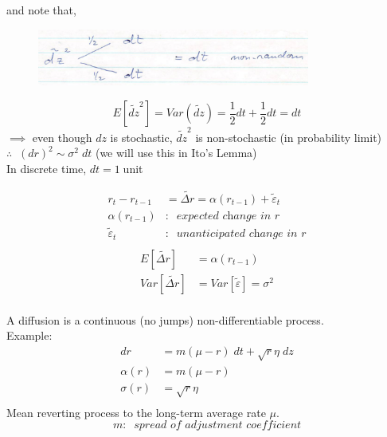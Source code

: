 \documentclass[
14pt,notheorems,hyperref={pdfauthor=whatever}
]{beamer}
\begin{document}
\begin{frame}
and note that,\\
\begin{figure}[dz2]
    \includegraphics[width=0.8\textwidth]{images/L17-dz2.png}
    \centering
\end{figure}
\[ E[\tilde{dz}^2] = Var(\tilde{dz}) = \frac{1}{2}dt+\frac{1}{2}dt = dt \]
$\implies$ even though $dz$ is stochastic, $\tilde{dz}^2$ is non-stochastic (in probability limit)\\
$\therefore \;\; (dr)^2 \sim \sigma^2\;dt$ (we will use this in Ito's Lemma)\\
\hfill\break
In discrete time, $dt = 1\;$unit
\end{frame}

\begin{frame}
\begin{align*}
    r_t-r_{t-1} &= \tilde{\Delta r} = \alpha(r_{t-1}) + \tilde\varepsilon_t\\
    \alpha(r_{t-1})&: \;\; \textit{expected change in $r$}\\
    \tilde\varepsilon_t&: \;\; \textit{unanticipated change in $r$}\\
\end{align*}
\begin{align*}
    E[\tilde{\Delta r}] &= \alpha(r_{t-1})\\
    Var[\tilde{\Delta r}] &= Var[\tilde\varepsilon] = \sigma^2\\
\end{align*}
\end{frame}

\begin{frame}
A diffusion is a continuous (no jumps) non-differentiable process.\\
\hfill\break
Example:
\begin{align*}
    dr &= m(\mu-r)\;dt + \sqrt{r}\eta\;dz\\
    \alpha(r) &= m(\mu-r)\\
    \sigma(r) &= \sqrt{r}\eta\\
\end{align*}
Mean reverting process to the long-term average rate $\mu$.\\
\[ m: \;\; \textit{spread of adjustment coefficient} \]
\end{frame}
\end{document}
